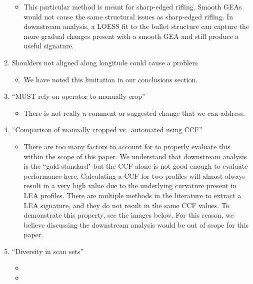 \documentclass[12pt]{article}
\providecommand{\tightlist}{%
  \setlength{\itemsep}{0pt}\setlength{\parskip}{0pt}}
\begin{document}
\begin{enumerate}
  \begin{itemize}
  \tightlist
  \item
    This particular method is meant for sharp-edged rifling. Smooth GEAs
    would not cause the same structural issues as sharp-edged rifling.
    In downstream analysis, a LOESS fit to the bullet structure can
    capture the more gradual changes present with a smooth GEA and still
    produce a useful signature.
  \end{itemize}
\item
  Shoulders not aligned along longitude could cause a problem

  \begin{itemize}
  \tightlist
  \item
    We have noted this limitation in our conclusions section.
  \end{itemize}
\item
  ``MUST rely on operator to manually crop''

  \begin{itemize}
  \tightlist
  \item
    There is not really a comment or suggested change that we can
    address.
  \end{itemize}
\item
  ``Comparison of manually cropped vs.~automated using CCF''

  \begin{itemize}
  \tightlist
  \item
    There are too many factors to account for to properly evaluate this
    within the scope of this paper. We understand that downstream
    analysis is the ``gold standard" but the CCF alone is not good
    enough to evaluate performance here. Calculating a CCF for two
    profiles will almost always result in a very high value due to the
    underlying curvature present in LEA profiles. There are multiple
    methods in the literature to extract a LEA signature, and they do
    not result in the same CCF values. To demonstrate this property, see
    the images below. For this reason, we believe discussing the
    downstream analysis would be out of scope for this paper.
  \end{itemize}
\item
  ``Diversity in scan sets''

  \begin{itemize}
  \item
    {\color{teal}{We have added an additional test set, Houston-test, to our results section. This has also been detailed in the data source section.}}
  \item
    {\color{teal}{The figures have been updated to include the Houston-test set, but the table has not. Should the table for Hamby and Houston be kept separate?}}
  \end{itemize}
\end{enumerate}
\end{document}
